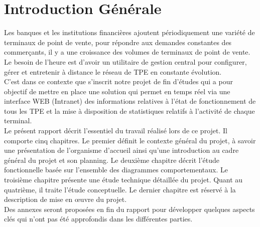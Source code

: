 \chapter*{Introduction Générale}
Les banques et les institutions financières ajoutent périodiquement une variété de terminaux de point de vente, pour répondre aux demandes constantes des commerçants, il y a une croissance des volumes de terminaux de point de vente. Le besoin de l'heure est d'avoir un utilitaire de gestion central pour configurer, gérer et entretenir à distance le réseau de TPE en constante évolution. \\

C'est dans ce contexte que s'inscrit notre projet de fin d’études qui a pour objectif de mettre en place une solution qui permet en temps réel via une interface WEB (Intranet) des informations relatives à l’état de fonctionnement de tous les TPE et la mise à disposition de statistiques relatifs  à l’activité de chaque terminal.\\

Le présent rapport décrit l’essentiel du travail réalisé lors de ce projet. Il comporte cinq chapitres. Le premier définit le contexte général du projet, à savoir une présentation de l’organisme d’accueil ainsi qu’une introduction au cadre général du projet et son planning. Le deuxième chapitre décrit l’étude fonctionnelle basée sur l’ensemble des diagrammes comportementaux. Le troisième chapitre présente une étude technique détaillée du projet. Quant au quatrième, il traite l'étude conceptuelle. Le dernier chapitre est réservé à la description de mise en œuvre du projet.\\ 

Des annexes seront proposées en fin du rapport pour développer quelques aspects clés qui n’ont pas été approfondis dans les différentes parties.